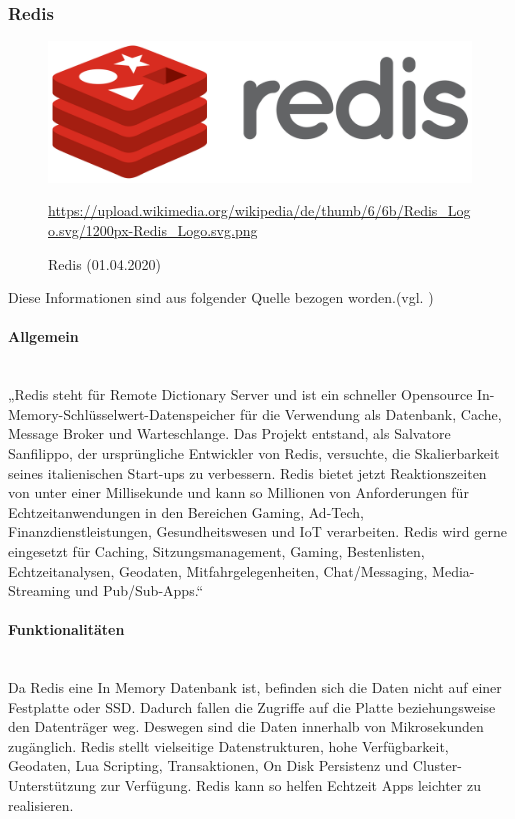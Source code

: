 \subsubsection{Redis}
\begin{figure}[H]
\centering
  \includegraphics[scale=0.25]{images/Redis.png}
  \caption[Redis (01.04.2020)]{Redis (01.04.2020)}
  \label{fig:Redis}
  \url{https://upload.wikimedia.org/wikipedia/de/thumb/6/6b/Redis_Logo.svg/1200px-Redis_Logo.svg.png}
\end{figure}
Diese Informationen sind aus folgender Quelle bezogen worden.(vgl. \cite{amazon_redis_2020})
\paragraph{Allgemein}\mbox{} \\
„Redis steht für Remote Dictionary Server und ist ein schneller Opensource In-Memory-Schlüsselwert-Datenspeicher für die Verwendung als Datenbank, Cache, Message Broker und Warteschlange. Das Projekt entstand, als Salvatore Sanfilippo, der ursprüngliche Entwickler von Redis, versuchte, die Skalierbarkeit seines italienischen Start-ups zu verbessern. Redis bietet jetzt Reaktionszeiten von unter einer Millisekunde und kann so Millionen von Anforderungen für Echtzeitanwendungen in den Bereichen Gaming, Ad-Tech, Finanzdienstleistungen, Gesundheitswesen und IoT verarbeiten. Redis wird gerne eingesetzt für Caching, Sitzungsmanagement, Gaming, Bestenlisten, Echtzeitanalysen, Geodaten, Mitfahrgelegenheiten, Chat/Messaging, Media-Streaming und Pub/Sub-Apps.“~\cite{amazon_redis_2020}
\paragraph{Funktionalitäten}\mbox{} \\
Da Redis eine In Memory Datenbank ist, befinden sich die Daten nicht auf einer Festplatte oder SSD. Dadurch fallen die Zugriffe auf die Platte beziehungsweise den Datenträger weg. Deswegen sind die Daten innerhalb von Mikrosekunden zugänglich. Redis stellt vielseitige Datenstrukturen, hohe Verfügbarkeit, Geodaten, Lua Scripting, Transaktionen, On Disk Persistenz und Cluster-Unterstützung zur Verfügung. Redis kann so helfen Echtzeit Apps leichter zu realisieren.
